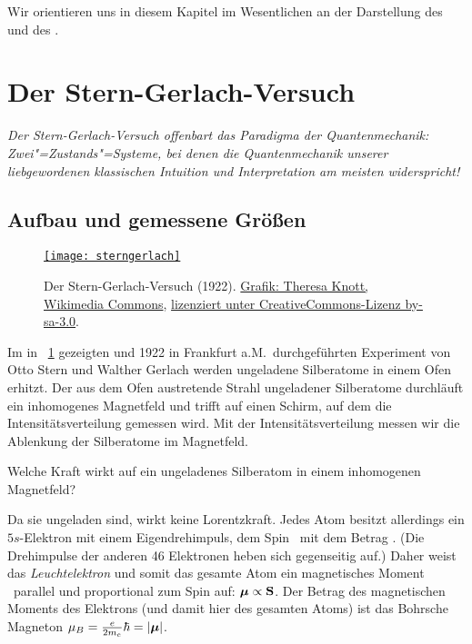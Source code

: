Wir orientieren uns in diesem Kapitel im Wesentlichen an der Darstellung des \textcite{Sakurai1994Modern} und des \textcite{Nolting2004Grundkurs}.

\section{Der Stern-Gerlach-Versuch}

\emph{Der Stern-Gerlach-Versuch offenbart das Paradigma der Quantenmechanik: Zwei"=Zustands"=Systeme, bei denen die Quantenmechanik unserer liebgewordenen klassischen Intuition und Interpretation am meisten widerspricht!}

\subsection{Aufbau und gemessene Gr\"o\ss{}en}
\begin{figure}
\href{http://commons.wikimedia.org/wiki/File:Stern-Gerlach_Experiment_de.png?uselang=de}{\texttt{[image: sterngerlach]}}
\caption{\label{fig:SG}Der Stern-Gerlach-Versuch (1922). \href{http://commons.wikimedia.org/wiki/File:Stern-Gerlach_Experiment_de.png?uselang=de}{Grafik: Theresa Knott, Wikimedia Commons}, \href{http://creativecommons.org/licenses/by-sa/3.0/deed.de}{lizenziert unter CreativeCommons-Lizenz by-sa-3.0}.}
\end{figure}

Im in \figurename~\ref{fig:SG} gezeigten und 1922 in Frankfurt a.M.\ durchgef\"uhrten Experiment von Otto Stern und Walther Gerlach werden ungeladene Silberatome in einem Ofen erhitzt. Der aus dem Ofen austretende Strahl ungeladener Silberatome durchl\"auft ein inhomogenes Magnetfeld und trifft auf einen Schirm, auf dem die Intensit\"atsverteilung gemessen wird. Mit der Intensit\"atsverteilung messen wir die Ablenkung der Silberatome im Magnetfeld.

\begin{frage}
 Welche Kraft wirkt auf ein ungeladenes Silberatom in einem inhomogenen Magnetfeld?
\end{frage}
\begin{antw}
Da sie ungeladen sind, wirkt keine Lorentzkraft. Jedes Atom besitzt allerdings ein $5s$-Elektron mit einem Eigendrehimpuls, dem Spin \spin\ mit dem Betrag \hbarh. (Die Drehimpulse der anderen 46 Elektronen heben sich gegenseitig auf.) Daher weist das \emph{Leuchtelektron} und somit das gesamte Atom ein magnetisches Moment \magnmom\ parallel und proportional zum Spin auf: $\boldsymbol{\mu} \propto \mathbf{S}$. Der Betrag des magnetischen Moments des Elektrons (und damit hier des gesamten Atoms) ist das Bohrsche Magneton $\mu_B = \frac{e}{2m_e}\hbar = |\boldsymbol{\mu}|$.
\end{antw}


